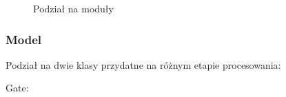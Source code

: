 \begin{figure}[!ht]
	\caption{\label{fig:flow_chart}Podział na moduły}
\end{figure}

\subsubsection{Model}

Podział na dwie klasy przydatne na różnym etapie procesowania:

Gate:


